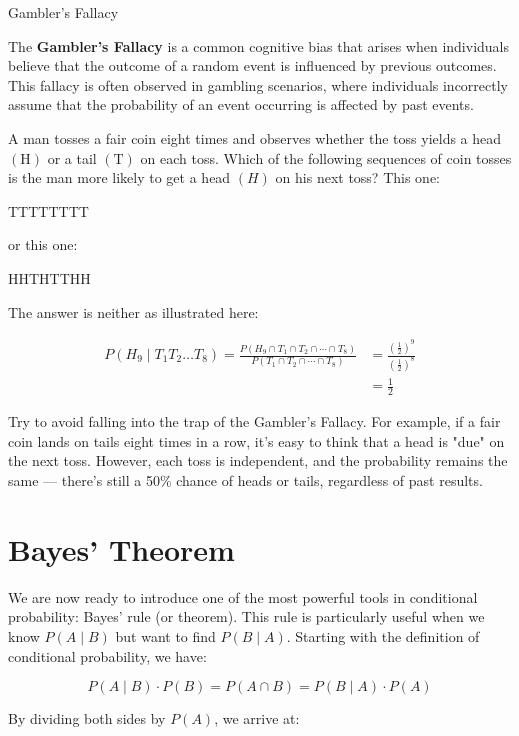 \begin{example}Gambler's Fallacy

The \textbf{Gambler's Fallacy }is a common cognitive bias that arises when individuals believe that the outcome of a random event is influenced by previous outcomes. This fallacy is often observed in gambling scenarios, where individuals incorrectly assume that the probability of an event occurring is affected by past events.

A man tosses a fair coin eight times and observes whether the toss yields a head $(\mathrm{H})$ or a tail $(\mathrm{T})$ on each toss. Which of the following sequences of coin tosses is the man more likely to get a head $(H)$ on his next toss? This one:

TTTTTTTT

or this one:

HHTHTTHH

The answer is neither as illustrated here:

\begin{align*}
        P\left(H_9 \mid T_1 T_2 \ldots T_8\right)=\frac{P\left(H_9 \cap T_1 \cap T_2 \cap \cdots \cap T_8\right)}{P\left(T_1 \cap T_2 \cap \cdots \cap T_8\right)} & =\frac{\left(\frac{1}{2}\right)^9}{\left(\frac{1}{2}\right)^8} \\
        & =\frac{1}{2}
\end{align*}
    
\end{example}

Try to avoid falling into the trap of the Gambler's Fallacy. For example, if a fair coin lands on tails eight times in a row, it’s easy to think that a head is "due" on the next toss. However, each toss is independent, and the probability remains the same — there’s still a 50\% chance of heads or tails, regardless of past results.

\section{Bayes' Theorem}
We are now ready to introduce one of the most powerful tools in conditional probability: Bayes' rule (or theorem). This rule is particularly useful when we know \( P(A \mid B) \) but want to find \( P(B \mid A) \). Starting with the definition of conditional probability, we have:

\[
P(A \mid B) \cdot P(B) = P(A \cap B) = P(B \mid A) \cdot P(A)
\]

By dividing both sides by \( P(A) \), we arrive at:

